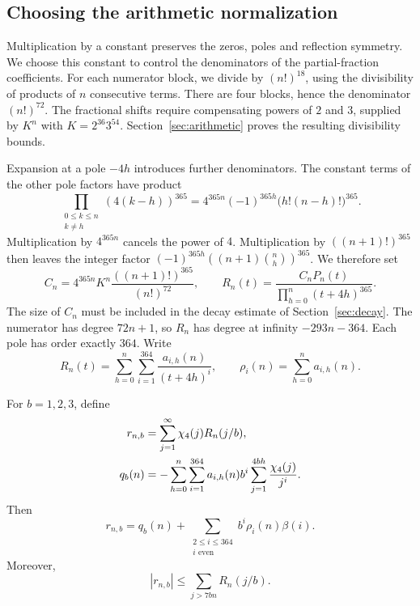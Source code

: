 \subsection{Choosing the arithmetic normalization}

Multiplication by a constant preserves the zeros, poles and reflection
symmetry. We choose this constant to control the denominators of the
partial-fraction coefficients. For each numerator block, we divide by
$(n!)^{18}$, using the divisibility of products of $n$ consecutive terms.
There are four blocks, hence the denominator $(n!)^{72}$.
The fractional shifts require compensating powers of $2$ and $3$,
supplied by $K^n$ with $K=2^{36}3^{54}$.
Section~\ref{sec:arithmetic} proves the resulting divisibility bounds.

Expansion at a pole $-4h$ introduces further denominators.
The constant terms of the other pole factors have product
\[
 \prod_{\substack{0\leq k\leq n\\k\ne h}}(4(k-h))^{365}
 =4^{365n}(-1)^{365h}\bigl(h!(n-h)!\bigr)^{365}.
\]
Multiplication by $4^{365n}$ cancels the power of $4$.
Multiplication by $((n+1)!)^{365}$ then leaves the integer factor
$(-1)^{365h}((n+1)\binom nh)^{365}$. We therefore set
\begin{equation}
 C_n=4^{365n}K^n\frac{((n+1)!)^{365}}{(n!)^{72}},\qquad
 R_n(t)=\frac{C_nP_n(t)}{\prod_{h=0}^{n}(t+4h)^{365}}.
 \label{eq:rn}
\end{equation}
The size of $C_n$ must be included in the decay estimate of
Section~\ref{sec:decay}. The numerator has degree $72n+1$, so $R_n$ has degree at
infinity $-293n-364$. Each pole has order exactly $364$. Write
\begin{equation}\label{eq:partials}
 R_n(t)=\sum_{h=0}^{n}\sum_{i=1}^{364}
              \frac{a_{i,h}(n)}{(t+4h)^i},\qquad
 \rho_i(n)=\sum_{h=0}^{n}a_{i,h}(n).
\end{equation}

\begin{samepage}
\begin{lemma}\label{lem:forms}
For $b=1,2,3$, define
\begin{align}
 r_{n,b}&=\sum_{j=1}^{\infty}\chi_4(j)R_n(j/b),\label{eq:rnb}\\
 q_b(n)&=-\sum_{h=0}^{n}\sum_{i=1}^{364}a_{i,h}(n)b^i
                   \sum_{j=1}^{4bh}\frac{\chi_4(j)}{j^i}.
                   \label{eq:qb}
\end{align}
Then
\begin{equation}\label{eq:forms}
 r_{n,b}=q_b(n)+\sum_{\substack{2\leq i\leq364\\i\text{ even}}}
                         b^i\rho_i(n)\beta(i).
\end{equation}
Moreover,
\begin{equation}\label{eq:positive-bound}
 |r_{n,b}|\leq\sum_{j>7bn}R_n(j/b).
\end{equation}
\end{lemma}
\end{samepage}

